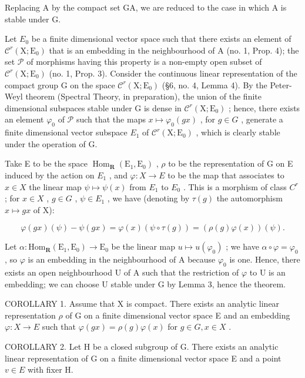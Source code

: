 Replacing A by the compact set GA, we are reduced to the case in which A is stable under G.

Let \(E_0\) be a finite dimensional vector space such that there exists an element of \(\mathcal{C}^r(\mathrm{X};\mathrm{E}_0)\) that is an embedding in the neighbourhood of A (no. 1, Prop. 4); the set \(\mathcal{P}\) of morphisms having this property is a non-empty open subset of \(\mathcal{C}^r(\mathrm{X};\mathrm{E}_0)\) (no. 1, Prop. 3). Consider the continuous linear representation of the compact group G on the space \(\mathcal{C}^r(\mathrm{X};\mathrm{E}_0)\) (§6, no. 4, Lemma 4). By the Peter-Weyl theorem (Spectral Theory, in preparation), the union of the finite dimensional subspaces stable under G is dense in \(\mathcal{C}^r(\mathrm{X};\mathrm{E}_0)\) ; hence, there exists an element \(\varphi_0\) of \(\mathcal{P}\) such that the maps \(x \mapsto \varphi_0(gx)\) , for \(g \in G\) , generate a finite dimensional vector subspace \(E_1\) of \(\mathcal{C}^r(\mathrm{X};\mathrm{E}_0)\) , which is clearly stable under the operation of G.

Take E to be the space \(\operatorname{Hom}_{\mathbf{R}}(\mathrm{E}_{1},\mathrm{E}_{0})\) , \(\rho\) to be the representation of G on E induced by the action on \(E_{1}\) , and \(\varphi:X\to E\) to be the map that associates to \(x\in X\) the linear map \(\psi\mapsto\psi(x)\) from \(E_{1}\) to \(E_{0}\) . This is a morphism of class \(C^{r}\) ; for \(x\in X\) , \(g\in G\) , \(\psi\in E_{1}\) , we have (denoting by \(\tau(g)\) the automorphism \(x\mapsto gx\) of X):

\[
\varphi (g x) (\psi) - \psi (g x) = \varphi (x) (\psi \circ \tau (g)) = (\rho (g) \varphi (x)) (\psi).
\]

Let \(\alpha : \mathrm{Hom}_{\mathbf{R}}(\mathrm{E}_1, \mathrm{E}_0) \to \mathrm{E}_0\) be the linear map \(u \mapsto u(\varphi_0)\) ; we have \(\alpha \circ \varphi = \varphi_0\) , so \(\varphi\) is an embedding in the neighbourhood of A because \(\varphi_0\) is one. Hence, there exists an open neighbourhood U of A such that the restriction of \(\varphi\) to U is an embedding; we can choose U stable under G by Lemma 3, hence the theorem.

COROLLARY 1. Assume that X is compact. There exists an analytic linear representation \(\rho\) of G on a finite dimensional vector space E and an embedding \(\varphi: X \to E\) such that \(\varphi(gx) = \rho(g)\varphi(x)\) for \(g \in G, x \in X\) .

COROLLARY 2. Let H be a closed subgroup of G. There exists an analytic linear representation of G on a finite dimensional vector space E and a point \(v \in E\) with fixer H.

